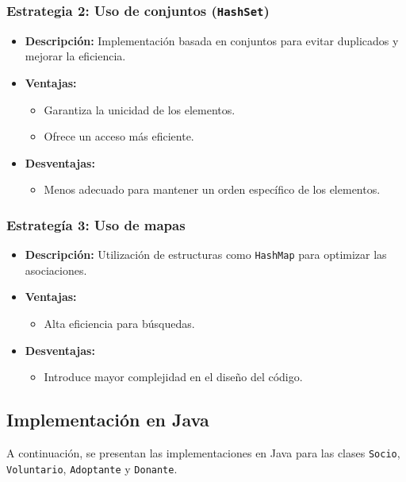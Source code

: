\subsubsection{Estrategia 2: Uso de conjuntos (\texttt{HashSet})}
\begin{itemize}
    \item \textbf{Descripción:} Implementación basada en conjuntos para evitar duplicados y mejorar la eficiencia.
    \item \textbf{Ventajas:}
    \begin{itemize}
        \item Garantiza la unicidad de los elementos.
        \item Ofrece un acceso más eficiente.
    \end{itemize}
    \item \textbf{Desventajas:}
    \begin{itemize}
        \item Menos adecuado para mantener un orden específico de los elementos.
    \end{itemize}
\end{itemize}

\subsubsection{Estrategía 3: Uso de mapas}
\begin{itemize}
    \item \textbf{Descripción:} Utilización de estructuras como \texttt{HashMap} para optimizar las asociaciones.
    \item \textbf{Ventajas:}
    \begin{itemize}
        \item Alta eficiencia para búsquedas.
    \end{itemize}
    \item \textbf{Desventajas:}
    \begin{itemize}
        \item Introduce mayor complejidad en el diseño del código.
    \end{itemize}
\end{itemize}

\subsection{Implementación en Java}

A continuación, se presentan las implementaciones en Java para las clases \texttt{Socio}, \texttt{Voluntario}, \texttt{Adoptante} y \texttt{Donante}.

